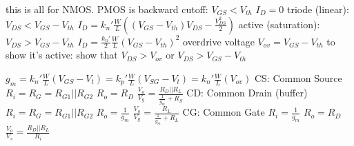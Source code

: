 \documentclass[12pt]{article}
\begin{document}
\begin{spacing}{0.8}
\begin{multicols*}{2}
\begin{flushleft}
\begin{outline}[longenum]
  \1 this is all for NMOS. PMOS is backward
  \1 cutoff: $V_{GS} < V_{th}$
    \2 $I_D=0$
  \1 triode (linear): $V_{DS} < V_{GS}-V_{th}$
    \2 $I_D = k_n' \frac{W}{L}
    \left( (V_{GS}-V_{th})V_{DS} - \frac{V_{DS}^2}{2} \right)$
  \1 active (saturation): $V_{DS} > V_{GS}-V_{th}$
    \2 $I_D = \frac{k_n'}{2}\frac{W}{L}(V_{GS}-V_{th})^2$
    \2 overdrive voltage $V_{ov}=V_{GS}-V_{th}$
  \1 to show it's active: show that $V_{DS} > V_{ov}$ or $V_{DS} > V_{GS} - V_{th}$

  \1 $g_m
    = k_n' \frac{W}{L}(V_{GS}-V_t)
    = k_p' \frac{W}{L}(V_{SG}-V_t)
    = k_n' \frac{W}{L}(V_{ov})
    $
  \1 CS: Common Source
    \2 $R_i=R_G=R_{G1}||R_{G2}$
    \2 $R_o=R_D$
    \2 $\frac{V_o}{V_g}=\frac{R_D||R_L}{\frac{1}{g_m}+R_S}$
  \1 CD: Common Drain (buffer)
    \2 $R_i=R_G=R_{G1}||R_{G2}$
    \2 $R_o=\frac{1}{g_m}$
    \2 $\frac{V_o}{V_g}=\frac{R_L}{\frac{1}{g_m}+R_L}$
  \1 CG: Common Gate
    \2 $R_i=\frac{1}{g_m}$
    \2 $R_o=R_D$
    \2 $\frac{V_o}{V_s}=\frac{R_D||R_L}{R_i}$




\end{outline}
\end{flushleft}
\end{multicols*}
\end{spacing}
\end{document}
